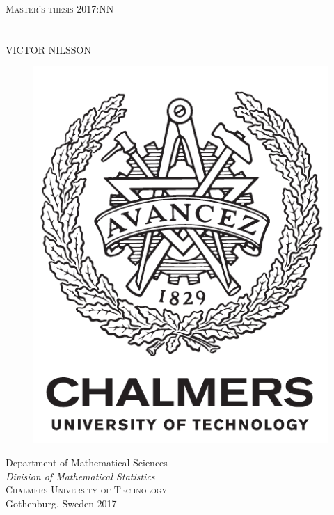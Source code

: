 \newpage
\thispagestyle{empty}
\begin{center}
	\textsc{\large Master's thesis 2017:NN}\\[4cm]		%
	\textbf{\Large \titlename} \\[1cm]
	{\large \subtitlename}\\[1cm]
	{\large VICTOR NILSSON}

	\vfill
	\begin{figure}[H]
	\centering
	\includegraphics[width=0.2\pdfpagewidth]{figure/auxiliary/logo_eng.pdf} \\
	\end{figure}	\vspace{5mm}

	Department of Mathematical Sciences \\
	\emph{Division of Mathematical Statistics}\\
	\textsc{Chalmers University of Technology} \\
	Gothenburg, Sweden 2017 \\
\end{center}



